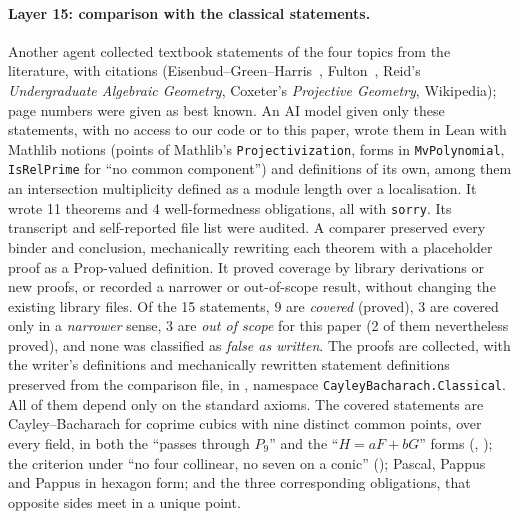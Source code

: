 \documentclass[11pt]{article}
\theoremstyle{definition}
\theoremstyle{remark}
\newcommand{\lean}[1]{\texttt{#1}}
\begin{document}
\paragraph{Layer 15: comparison with the classical statements.}
Another agent collected textbook statements of the four topics from the literature, with citations
(Eisenbud--Green--Harris~\cite{EGH}, Fulton~\cite[\S5.6]{Fulton}, Reid's \emph{Undergraduate
Algebraic Geometry}, Coxeter's \emph{Projective Geometry}, Wikipedia); page numbers were given as best
known. An AI model given only these statements, with no access to our code or to this paper, wrote them
in Lean with Mathlib notions (points of Mathlib's \lean{Projectivization}, forms in \lean{MvPolynomial},
\lean{IsRelPrime} for ``no common component'') and definitions of its own, among them an intersection
multiplicity defined as a module length over a localisation. It wrote 11 theorems and 4 well-formedness
obligations, all with \lean{sorry}. Its transcript and self-reported file list were audited. A comparer
preserved every binder and conclusion, mechanically rewriting each theorem with a placeholder proof
as a Prop-valued definition. It proved coverage by library derivations or new proofs, or recorded a
narrower or out-of-scope result, without changing the existing library files. Of the 15 statements, 9 are \emph{covered} (proved), 3 are covered only in a
\emph{narrower} sense, 3 are \emph{out of scope} for this paper (2 of them nevertheless proved), and none
was classified as \emph{false as written}. The proofs are collected, with the writer's definitions and mechanically
rewritten statement definitions preserved from the comparison file, in , namespace
\lean{CayleyBacharach.Classical}. All of them depend only on the standard axioms. The covered statements
are Cayley--Bacharach for coprime cubics with nine distinct common points, over every field, in both
the ``passes through $P_9$'' and the ``$H=aF+bG$'' forms (, ); the
criterion under ``no four collinear, no seven on a conic'' (); Pascal, Pappus and
Pappus in hexagon form; and the three corresponding obligations, that opposite sides meet in a unique
point.
\end{document}
